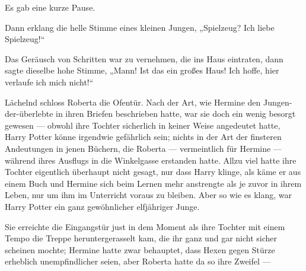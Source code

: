 Es gab eine kurze Pause.

Dann erklang die helle Stimme eines kleinen Jungen,
„Spielzeug? Ich liebe Spielzeug!“

Das Geräusch von Schritten war zu vernehmen, die ins Haus eintraten, dann sagte dieselbe hohe Stimme,
„Mann! Ist das ein großes Haus! Ich hoffe, hier verlaufe ich mich nicht!“

Lächelnd schloss Roberta die Ofentür. Nach der Art, wie Hermine den Jungen-der-überlebte in ihren Briefen beschrieben hatte, war sie doch ein wenig besorgt gewesen — obwohl ihre Tochter sicherlich in keiner Weise angedeutet hatte, Harry Potter könne irgendwie gefährlich sein; nichts in der Art der finsteren Andeutungen in jenen Büchern, die Roberta — vermeintlich für Hermine — während ihres Ausflugs in die Winkelgasse erstanden hatte. Allzu viel hatte ihre Tochter eigentlich überhaupt nicht gesagt, nur dass Harry klinge, als käme er aus einem Buch und Hermine sich beim Lernen mehr anstrengte als je zuvor in ihrem Leben, nur um ihm im Unterricht voraus zu bleiben. Aber so wie es klang, war Harry Potter ein ganz gewöhnlicher elfjähriger Junge.

Sie erreichte die Eingangstür just in dem Moment als ihre Tochter mit einem Tempo die Treppe heruntergerasselt kam, die ihr ganz und gar nicht sicher scheinen mochte; Hermine hatte zwar behauptet, dass Hexen gegen Stürze erheblich unempfindlicher seien, aber Roberta hatte da so ihre Zweifel —

